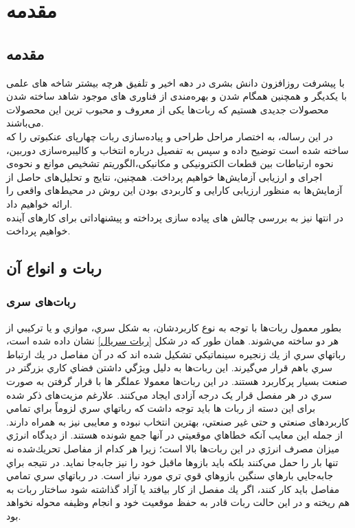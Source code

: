 
\chapter{مقدمه}

\section{مقدمه}
با پیشرفت روزافزون دانش بشری در دهه اخیر و تلفیق هرچه بیشتر شاخه های علمی با یکدیگر و همچنین همگام شدن و بهره‌مندی از فناوری های موجود شاهد ساخته شدن محصولات جدیدی هستیم که ربات‌ها یکی از معروف و محبوب ترین این محصولات می‌باشند.\\
در این رساله، به اختصار مراحل طراحی و پیاده‌سازی ربات چهارپای عنکبوتی را که ساخته شده است توضیح داده و سپس به تفصیل درباره انتخاب و کالیبره‌سازی دوربین، نحوه ارتباطات بین قطعات الکترونیکی و مکانیکی،الگوریتم تشخیص موانع و نحوه‌ی اجرای و ارزیابی آزمایش‌ها خواهیم پرداخت. همچنین، نتایج و تحلیل‌های حاصل از آزمایش‌ها به منظور ارزیابی کارایی و کاربردی بودن این روش در محیط‌های واقعی را ارائه خواهیم داد.\\
در انتها نیز به بررسی چالش های پیاده سازی پرداخته و پیشنهاداتی برای کارهای آینده خواهیم پرداخت.


\section{ربات و انواع آن}

\subsection{ربات‌های سری}
بطور معمول ربات‌ها با توجه به نوع كاربردشان، به شكل سري، موازي و يا تركيبي از هر دو ساخته مي‌شوند. همان طور كه در شكل
\ref{ربات سریال}
نشان داده شده است، رباتهاي سري از يك زنجيره
سينماتيكي تشكيل شده اند كه در آن مفاصل‌ در يك ارتباط سري باهم قرار مي‌گيرند. اين ربات‌ها به دليل ويژگي داشتن فضاي كاري بزرگتر در صنعت بسيار پرکاربرد هستند.
در این ربات‌ها معمولا عملگر
\noindent\unskip{}
ها با قرار گرفتن به صورت سري در هر مفصل قرار یک درجه آزادی ایجاد می‌کنند.
علارغم مزیت‌های ذکر شده برای این دسته از ربات ها باید توجه داشت که رباتهاي سري لزوماً براي تمامي کاربرد‌های صنعتي و حتی غير صنعتي، بهترين انتخاب نبوده و معایبی نیز به همراه دارند. از جمله این معایب آنکه خطاهاي موقعيتي در آنها جمع شونده هستند. از ديدگاه انرژي ميزان مصرف انرژي در اين ربات‌ها بالا است؛ زيرا هر كدام از
مفاصل تحريك‌شده نه تنها بار را حمل مي‌كنند بلكه بايد بازوها ماقبل خود را نيز جابه‌جا نمايد. در نتيجه براي جابه‌جايي بارهاي سنگين بازوهاي قوي تري مورد نياز است. در رباتهاي سري تمامي مفاصل بايد كار كنند، اگر يك مفصل از كار بيافتد يا آزاد گذاشته شود ساختار ربات به هم ریخته و در اين حالت ربات قادر به حفظ موقعيت خود و انجام وظیفه
\noindent\unskip{}
محوله نخواهد بود.



